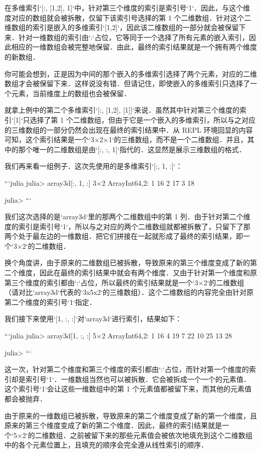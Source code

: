在多维索引`[:, [1,2], 1]`中，针对第三个维度的索引是索引号`1`．因此，与这个维度对应的数组就会被拆散，仅留下该索引号选择的第 1 个二维数组．针对这个二维数组的索引是嵌入的多维索引`[1,2]`，因此该二维数组的一部分就会被保留下来．针对一维数组的索引由`:`占位，它等同于一个选择了所有元素的嵌入索引，因此相应的一维数组会被完整地保留．由此，最终的索引结果就是一个拥有两个维度的新数组．

你可能会想到，正是因为中间的那个嵌入的多维索引选择了两个元素，对应的二维数组才会被保留下来．这样说没有错．但请记住，即使嵌入的多维索引只选择了一个元素，当前维度上的数组也会被保留．

就拿上例中的第二个多维索引`[:, [1,2], [1]]`来说．虽然其中针对第三个维度的索引`[1]`只选择了第 1 个二维数组，但由于它是一个嵌入的多维索引，所以与之对应的三维数组的一部分仍然会出现在最终的索引结果中．从 REPL 环境回显的内容可知，这个索引结果是一个`3×2×1`的三维数组，而不是一个二维数组．并且，其中的那个唯一的二维数组是由`[:, :, 1]`指代的．这显然是展示三维数组的格式．

我们再来看一组例子．这次先使用的是多维索引`[:, 1, :]`：

```julia
julia> array3d[:, 1, :]
3×2 Array{Int64,2}:
 1  16
 2  17
 3  18

julia> 
```

我们这次选择的是`array3d`里的那两个二维数组中的第 1 列．由于针对第二个维度的索引是索引号`1`，所以与之对应的两个二维数组就都被拆散了，只留下了那两个处于最左边的一维数组．把它们拼接在一起就形成了最终的索引结果，即一个`3×2`的二维数组．

换个角度讲，由于原来的二维数组已被拆散，导致原来的第三个维度变成了新的第二个维度，因此在最终的索引结果中就会有两个维度．又由于针对第一个维度和原第三个维度的索引都由`:`占位，所以最终的索引结果就是一个`3×2`的二维数组（请对比`array3d`代表的`3x5x2`的三维数组）．这个二维数组的内容完全由针对原第二个维度的索引号`1`指定．

我们接下来使用`[1, :, :]`对`array3d`进行索引，结果如下：

```julia
julia> array3d[1, :, :]
5×2 Array{Int64,2}:
  1  16
  4  19
  7  22
 10  25
 13  28

julia> 
```

这一次，针对第二个维度和第三个维度的索引都由`:`占位，而针对第一个维度的索引却是索引号`1`．一维数组当然也可以被拆散．它会被拆成一个一个的元素值．这个索引号`1`会让这些一维数组中的第 1 个元素值都被留下来，而其他的元素值都会被抛弃．

由于原来的一维数组已被拆散，导致原来的第二个维度变成了新的第一个维度，且原来的第三个维度变成了新的第二个维度．因此，最终的索引结果就是一个`5×2`的二维数组．之前被留下来的那些元素值会被依次地填充到这个二维数组中的各个元素位置上，且填充的顺序会完全遵从线性索引的顺序．

